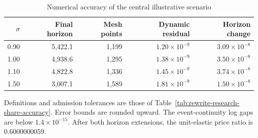 \begin{table}[H]
 \centering
 \caption{Numerical accuracy of the central illustrative scenario}
 \label{tab:rewrite-rsi-half-accuracy}
 \small
 \begin{tabular}{rrrrr}
 \toprule
 $\sigma$ & Final horizon & Mesh points & Dynamic residual & Horizon change\\
 \midrule
 0.90 & 5,422.1 & 1,199 & $1.20\times10^{-9}$ & $3.09\times10^{-8}$\\
 1.00 & 4,938.6 & 1,295 & $1.38\times10^{-9}$ & $3.50\times10^{-8}$\\
 1.10 & 4,822.8 & 1,336 & $1.45\times10^{-9}$ & $3.74\times10^{-8}$\\
 1.50 & 3,007.1 & 1,589 & $1.81\times10^{-9}$ & $1.50\times10^{-8}$\\
 \bottomrule
 \end{tabular}
 \par\smallskip
 \begin{minipage}{0.95\textwidth}\footnotesize
 Definitions and admission tolerances are those of Table~\ref{tab:rewrite-research-share-accuracy}.
 Error bounds are rounded upward. The event-continuity log gaps are below
 $1.4\times10^{-15}$. After both horizon extensions, the unit-elastic
 price ratio is $0.6000000059$.
 \end{minipage}
\end{table}
